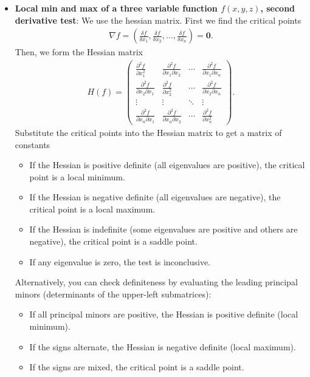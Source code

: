 \documentclass{report}
\begin{document}
\begin{itemize}
        \item \textbf{Local min and max of a three variable function $f(x,y,z)$, second derivative test}: We use the hessian matrix. First we find the critical points 
            \begin{align*}
                \nabla f = \left(\frac{\delta f}{\delta x_{1}}, \frac{\delta f}{\delta x_{2}}, ... , \frac{\delta f}{\delta x_{n}}\right) = \mathbf{0}
            .\end{align*}
            Then, we form the Hessian matrix
            \begin{align*}
                                H(f) = 
                \begin{pmatrix}
                    \frac{\partial^2 f}{\partial x_1^2} & \frac{\partial^2 f}{\partial x_1 \partial x_2} & \cdots & \frac{\partial^2 f}{\partial x_1 \partial x_n} \\
                    \frac{\partial^2 f}{\partial x_2 \partial x_1} & \frac{\partial^2 f}{\partial x_2^2} & \cdots & \frac{\partial^2 f}{\partial x_2 \partial x_n} \\
                    \vdots & \vdots & \ddots & \vdots \\
                    \frac{\partial^2 f}{\partial x_n \partial x_1} & \frac{\partial^2 f}{\partial x_n \partial x_2} & \cdots & \frac{\partial^2 f}{\partial x_n^2}
                \end{pmatrix}
            .\end{align*}
            Substitute the critical points into the Hessian matrix to get a matrix of constants
            \bigbreak \noindent 
            \begin{itemize}
                \item If the Hessian is positive definite (all eigenvalues are positive), the critical point is a local minimum.
                \item If the Hessian is negative definite (all eigenvalues are negative), the critical point is a local maximum.
                \item If the Hessian is indefinite (some eigenvalues are positive and others are negative), the critical point is a saddle point.
                \item If any eigenvalue is zero, the test is inconclusive.
            \end{itemize}
            Alternatively, you can check definiteness by evaluating the leading principal minors (determinants of the upper-left submatrices):
            \begin{itemize}
                \item If all principal minors are positive, the Hessian is positive definite (local minimum).
                \item If the signs alternate, the Hessian is negative definite (local maximum).
                \item If the signs are mixed, the critical point is a saddle point.
            \end{itemize}
    \end{itemize}
\end{document}
